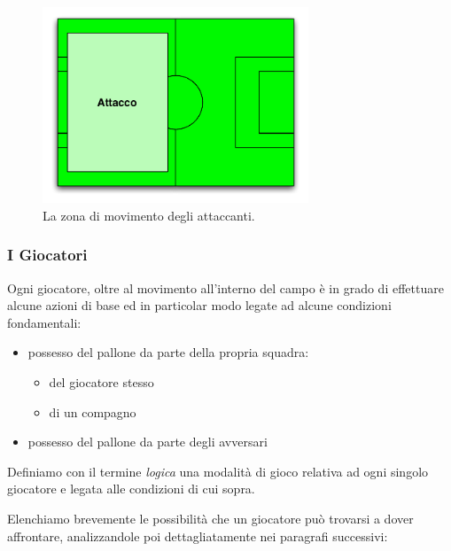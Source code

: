 \documentclass[aps,letterpaper,10pt]{article}
\begin{document}
\begin{figure}[H]
	\begin{center}
		\includegraphics[width=300px]{images/attack.pdf}
	\end{center}
\caption{La zona di movimento degli attaccanti.}
\end{figure}

\subsubsection{I Giocatori}

Ogni giocatore, oltre al movimento all'interno del campo \`e in grado di effettuare alcune azioni di base ed in particolar modo legate ad alcune condizioni fondamentali:

\begin{itemize}
	\item possesso del pallone da parte della propria squadra:
		\begin{itemize}
			\item del giocatore stesso
			\item di un compagno
		\end{itemize}
	\item possesso del pallone da parte degli avversari
\end{itemize}
	
Definiamo con il termine \textit{logica} una modalit\`a di gioco relativa ad ogni singolo giocatore e legata alle condizioni di cui sopra. \vspace{3mm}

Elenchiamo brevemente le possibilit\`a che un giocatore pu\`o trovarsi a dover affrontare, analizzandole poi dettagliatamente nei paragrafi successivi:
\end{document}
